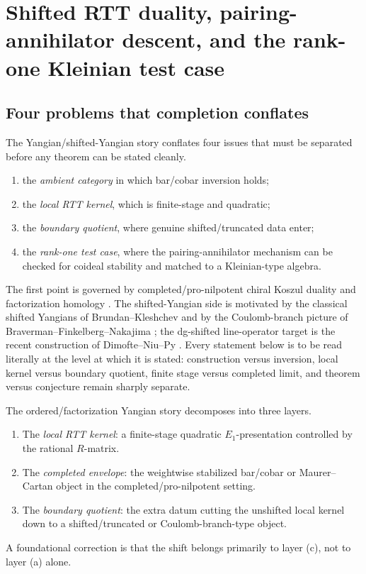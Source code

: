 
\chapter{Shifted RTT duality, pairing-annihilator descent, and the rank-one Kleinian test case}
\label{chap:shifted-rtt-orthogonal-coideals}

\section{Four problems that completion conflates}
\label{sec:purpose-status-discipline}

The Yangian/shifted-Yangian story conflates four issues that must be separated
before any theorem can be stated cleanly.

\begin{enumerate}[label=\textup{(\roman*)}]
\item the \emph{ambient category} in which bar/cobar inversion holds;
\item the \emph{local RTT kernel}, which is finite-stage and quadratic;
\item the \emph{boundary quotient}, where genuine shifted/truncated data enter;
\item the \emph{rank-one test case}, where the pairing-annihilator mechanism can
 be checked for coideal stability and matched to a Kleinian-type algebra.
\end{enumerate}

The first point is governed by completed/pro-nilpotent chiral Koszul duality and
factorization homology \cite{FG12,AF15,AF20}. The shifted-Yangian side is
motivated by the classical shifted Yangians of Brundan--Kleshchev and by the
Coulomb-branch picture of Braverman--Finkelberg--Nakajima
\cite{BrunKlesh06,BFN18}; the dg-shifted line-operator target is the recent
construction of Dimofte--Niu--Py \cite{DNP25}. Every
statement below is to be read literally at the level at which it is stated:
construction versus inversion, local kernel versus boundary quotient, finite
stage versus completed limit, and theorem versus conjecture remain sharply
separate.

\begin{definition}
\label{def:three-layers-ordered-theory-appendix}
The ordered/factorization Yangian story decomposes into three layers.
\begin{enumerate}[label=\textup{(\alph*)}]
\item The \emph{local RTT kernel}: a finite-stage quadratic $E_1$-presentation
 controlled by the rational $R$-matrix.
\item The \emph{completed envelope}: the weightwise stabilized bar/cobar or
 Maurer--Cartan object in the completed/pro-nilpotent setting.
\item The \emph{boundary quotient}: the extra datum cutting the unshifted local
 kernel down to a shifted/truncated or Coulomb-branch-type object.
\end{enumerate}
A foundational correction is that the shift belongs primarily to layer
\textup{(c)}, not to layer \textup{(a)} alone.
\end{definition}

